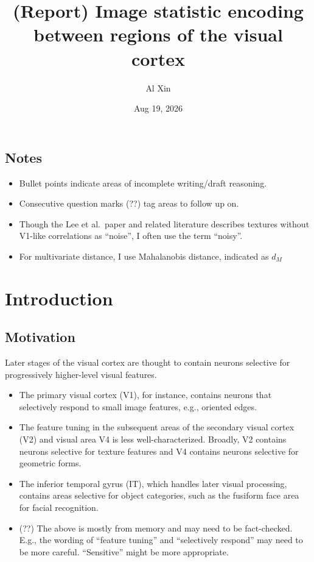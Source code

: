 \documentclass[
  11pt,
  letterpaper,
  DIV=11,
  numbers=noendperiod]{scrartcl}
\title{(Report) Image statistic encoding between regions of the visual
cortex}
\author{\small Al Xin}
\date{Aug 19, 2026}
\providecommand{\tightlist}{%
  \setlength{\itemsep}{0pt}\setlength{\parskip}{0pt}}
\begin{document}
\maketitle


\subsection{Notes}\label{notes}

\begin{itemize}
\tightlist
\item
  Bullet points indicate areas of incomplete writing/draft reasoning.
\item
  Consecutive question marks (??) tag areas to follow up on.
\item
  Though the Lee et al.~paper and related literature describes textures
  without V1-like correlations as ``noise'', I often use the term
  ``noisy''.
\item
  For multivariate distance, I use Mahalanobis distance, indicated as
  \(d_M\)
\end{itemize}

\section{Introduction}\label{introduction}

\subsection{Motivation}\label{motivation}

Later stages of the visual cortex are thought to contain neurons
selective for progressively higher-level visual features.

\begin{itemize}
\tightlist
\item
  The primary visual cortex (V1), for instance, contains neurons that
  selectively respond to small image features, e.g., oriented edges.
\item
  The feature tuning in the subsequent areas of the secondary visual
  cortex (V2) and visual area V4 is less well-characterized. Broadly, V2
  contains neurons selective for texture features and V4 contains
  neurons selective for geometric forms.
\item
  The inferior temporal gyrus (IT), which handles later visual
  processing, contains areas selective for object categories, such as
  the fusiform face area for facial recognition.
\item
  (??) The above is mostly from memory and may need to be fact-checked.
  E.g., the wording of ``feature tuning'' and ``selectively respond''
  may need to be more careful. ``Sensitive'' might be more appropriate.
\end{itemize}
\end{document}
